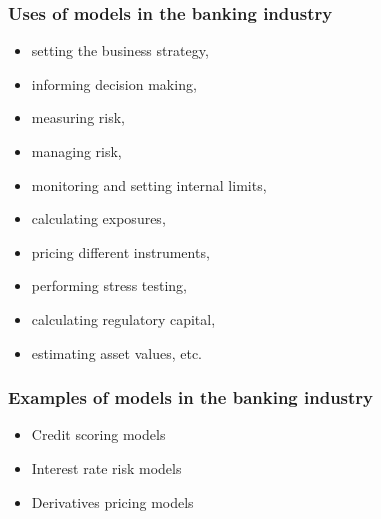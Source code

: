 \documentclass[11pt]{beamer}
\begin{document}
\begin{frame}
\frametitle{Uses of models in the banking industry}
\begin{itemize}
	\item setting the business strategy, 
	\item informing decision making, 
	\item measuring risk, 
	\item managing risk, 
	\item monitoring and setting internal limits, 
	\item calculating exposures, 
	\item pricing different instruments, 
	\item performing stress testing, 
	\item calculating regulatory capital, 
	\item estimating asset values, etc.
\end{itemize}
\end{frame}


\begin{frame}
\frametitle{Examples of models in the banking industry}
\begin{itemize}
	\item Credit scoring models %
	\item Interest rate risk models %
	\item Derivatives pricing models %
\end{itemize}
\end{frame}
\end{document}
